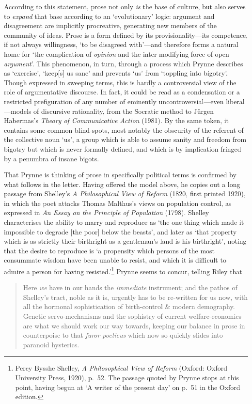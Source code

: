 \documentclass[]{article}
\begin{document}
\noindent According to this statement, prose not only \emph{is} the base
of culture, but also serves to \emph{expand} that base according to an
`evolutionary' logic: argument and disagreement are implicitly
procreative, generating new members of the community of ideas. Prose is
a form defined by its provisionality---its competence, if not always
willingness, `to be disagreed with'---and therefore forms a natural home
for `the complication of \emph{opinion} and the inter-modifying force of
open \emph{argument}'. This phenomenon, in turn, through a process which
Prynne describes as `exercise', `keep{[}s{]} us sane' and prevents `us'
from `toppling into bigotry'. Though expressed in sweeping terms, this
is hardly a controversial view of the role of argumentative discourse.
In fact, it could be read as a condensation or a restricted
prefiguration of any number of eminently uncontroversial---even
liberal---models of discursive rationality, from the Socratic method to
Jürgen Habermas's \emph{Theory of Communicative Action} (1981). By the
same token, it contains some common blind-spots, most notably the
obscurity of the referent of the collective noun `us', a group which is
able to assume sanity and freedom from bigotry but which is never
formally defined, and which is by implication fringed by a penumbra of
insane bigots.

That Prynne is thinking of prose in specifically political terms is
confirmed by what follows in the letter. Having offered the model above,
he copies out a long passage from Shelley's \emph{A Philosophical View
of Reform} (1820, first printed 1920), in which the poet attacks Thomas
Malthus's views on population control, as expressed in \emph{An Essay on
the Principle of Population} (1798). Shelley characterises the ability
to marry and reproduce as `the one thing which made it impossible to
degrade {[}the poor{]} below the beasts', and later as `that property
which is as strictly their birthright as a gentleman's land is his
birthright', noting that the desire to reproduce is `a propensity which
persons of the most consummate wisdom have been unable to resist, and
which it is difficult to admire a person for having resisted.'\footnote{Percy
  Bysshe Shelley, \emph{A Philosophical View of Reform} (Oxford: Oxford
  University Press, 1920), p.~52. The passage quoted by Prynne stops at
  this point, having begun at `A writer of the present day' on p.~51 in
  the Oxford edition.} Prynne seems to concur, telling Riley that

\begin{quote}
Here \emph{we} have in our hands the \emph{immediate} instrument; and
the pathos of Shelley's tract, noble as it is, urgently has to be
re-written for us now, with all the hormonal sophistication of
birth-control \& modern demography. Genetic servo-mechanisms and the
sophistry of current welfare-economics are what we should work our way
towards, keeping our balance in prose in counterpoise to that
\emph{furor poeticus} which now so quickly slides into paranoid
hysterics.
\end{quote}
\end{document}
